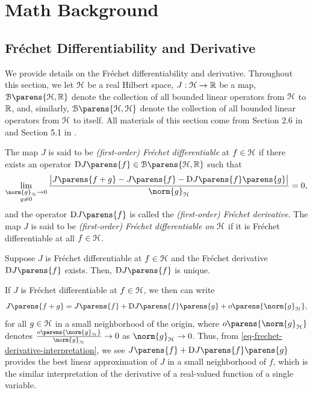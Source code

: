 \chapter{Math Background}
\label{app1}


\section{Fr{\'e}chet Differentiability and Derivative}\label{section-frechet-differentiable}

We provide details on the Fr{\'e}chet differentiability and derivative. Throughout this section, we let $\mathcal{H}$ be a real Hilbert space, $J: \mathcal{H} \to \mathbb{R}$ be a map, $\calB \parens{\calH, \Real}$ denote the collection of all bounded linear operators from $\mathcal{H}$ to $\mathbb{R}$, and, similarly, $\calB \parens{\calH, \calH}$ denote the collection of all bounded linear operators from $\mathcal{H}$ to itself. All materials of this section come from Section 2.6 in \textcite{Bauschke2017-he} and Section 5.1 in \textcite{Denkowski2013-ke}. 

\begin{definition}\label{def-frechet-differentiable}
	The map $J$ is said to be \textit{(first-order) Fr{\'e}chet differentiable} at $f \in \mathcal{H}$ if there exists an operator $\Diff J \parens{f} \in \calB \parens{\calH, \Real}$ such that 
	\begin{align}\label{eq-frederivative}
	    \lim_{\substack{\norm{g}_{\calH} \to 0 \\ g \neq 0}} \frac{\abs[\big]{J \parens{f + g} - J \parens{f} - \Diff J \parens{f}\parens{g}}}{\norm{g}_{\calH}} = 0, 
	\end{align}
	and the operator $\Diff J \parens{f}$ is called the \textit{(first-order) Fr{\'e}chet derivative}. The map $J$ is said to be \textit{(first-order) Fr{\'e}chet differentiable on $\mathcal{H}$} if it is Fr{\'e}chet differentiable at all $f \in \mathcal{H}$. 
\end{definition}

\begin{proposition}
	Suppose $J$ is Fr{\'e}chet differentiable at $f \in \mathcal{H}$ and the Fr{\'e}chet derivative $\Diff J \parens{f}$ exists. Then, $\Diff J \parens{f}$ is unique. 
\end{proposition}

\begin{remark}
	If $J$ is Fr{\'e}chet differentiable at $f \in \mathcal{H}$, we then can write 
	\begin{align}\label{eq-frechet-derivative-interpretation}
		J \parens{f + g} = J \parens{f} + \Diff J \parens{f} \parens{g} + o \parens{\norm{g}_{\calH}}, 
	\end{align}
	for all $g \in \mathcal{H}$ in a small neighborhood of the origin, where $o \parens{\norm{g}_{\calH}}$ denotes $\frac{o \parens{\norm{g}_{\calH}}}{\norm{g}_{\calH}} \to 0$ as $\norm{g}_{\calH} \to 0$. Thus, from \eqref{eq-frechet-derivative-interpretation}, we see $J \parens{f} + \Diff J \parens{f} \parens{g}$ provides the best linear approximation of $J$ in a small neighborhood of $f$, which is the similar interpretation of the derivative of a real-valued function of a single variable. 
\end{remark}

